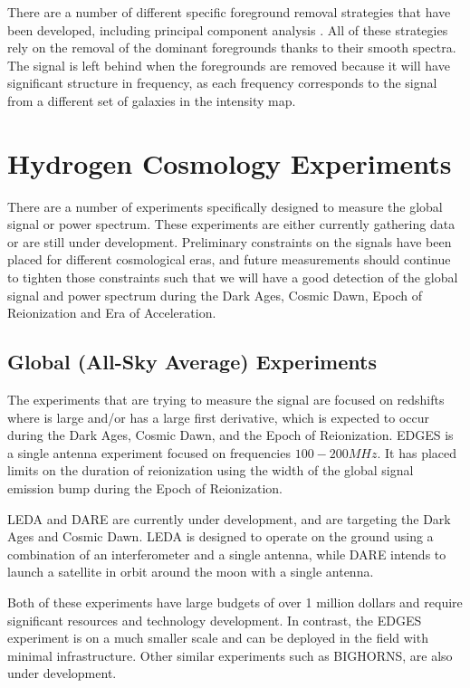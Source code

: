 There are a number of different specific foreground removal strategies that have been developed, including principal component analysis \cite{masui_2012}\cite{switzer_2013}. All of these strategies rely on the removal of the dominant foregrounds thanks to their smooth spectra. The \cm signal is left behind when the foregrounds are removed because it will have significant structure in frequency, as each frequency corresponds to  the signal from a different set of galaxies in the intensity map. 

\section{Hydrogen \cm Cosmology Experiments} \label{Sec:cm_expts}
There are a number of experiments specifically designed to measure the \cm global signal or power spectrum. These experiments are either currently gathering data or are still under development. Preliminary constraints on the \cm signals have been placed for different cosmological eras, and future measurements should continue to tighten those constraints such that we will have a good detection of the \cm global signal and power spectrum during the Dark Ages, Cosmic Dawn, Epoch of Reionization and Era of Acceleration. 

\subsection{Global (All-Sky Average) Experiments}
The experiments that are trying to measure the \avgdtb signal are focused on redshifts where \dtb is large and/or has a large first derivative, which is expected to occur during the Dark Ages, Cosmic Dawn, and the Epoch of Reionization. EDGES \cite{bowman_2008} is a single antenna experiment focused on frequencies $100-200 MHz$. It has placed limits on the duration of reionization using the width of the \cm global signal emission bump during the Epoch of Reionization. 

LEDA \cite{leda}\cite{bernardi_2014} and DARE \cite{burns_2011} are currently under development, and are targeting the Dark Ages and Cosmic Dawn. LEDA is designed to operate on the ground using a combination of an interferometer and a single antenna, while DARE intends to launch a satellite in orbit around the moon with a single antenna. 

Both of these experiments have large budgets of over 1 million dollars and require significant resources and technology development. In contrast, the EDGES experiment is on a much smaller scale and can be deployed in the field with minimal infrastructure. Other similar experiments such as BIGHORNS\cite{bighorns}\cite{sokolowski_2015}, are also under development. 


